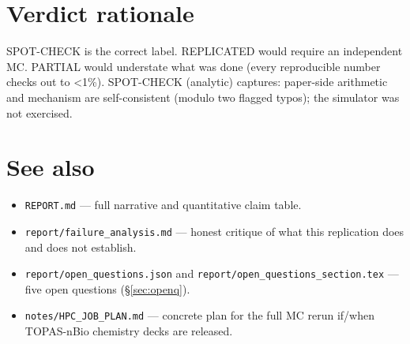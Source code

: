 \documentclass[11pt]{article}
\begin{document}
\section{Verdict rationale}
SPOT-CHECK is the correct label. REPLICATED would require an independent MC.
PARTIAL would understate what was done (every reproducible number checks out
to \textless1\%). SPOT-CHECK (analytic) captures: paper-side arithmetic and
mechanism are self-consistent (modulo two flagged typos); the simulator was
not exercised.

\section*{See also}
\begin{itemize}
  \item \texttt{REPORT.md} --- full narrative and quantitative claim table.
  \item \texttt{report/failure\_analysis.md} --- honest critique of what
        this replication does and does not establish.
  \item \texttt{report/open\_questions.json} and
        \texttt{report/open\_questions\_section.tex} --- five open questions
        (\S\ref{sec:openq}).
  \item \texttt{notes/HPC\_JOB\_PLAN.md} --- concrete plan for the full MC
        rerun if/when TOPAS-nBio chemistry decks are released.
\end{itemize}


\end{document}
